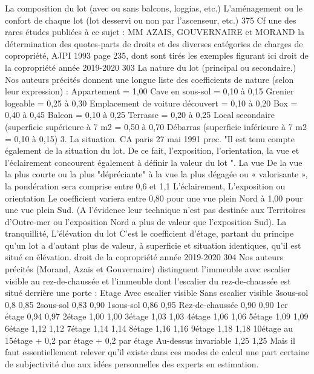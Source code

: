		La composition du lot (avec ou sans balcons, loggias, etc.)
		L'aménagement ou le confort de chaque lot (lot desservi ou non par l'ascenseur, etc.)
		375 Cf une des rares études publiées à ce sujet : MM AZAIS, GOUVERNAIRE et MORAND la détermination des quotes-parts de droits et des diverses catégories de charges de copropriété, AJPI 1993 page 235, dont sont tirés les exemples figurant ici
		droit de la copropriété année 2019-2020
		303
		La nature du lot (principal ou secondaire.)
		Nos auteurs précités donnent une longue liste des coefficients de nature (selon leur expression) :
		Appartement = 1,00
		Cave en sous-sol = 0,10 à 0,15
		Grenier logeable = 0,25 à 0,30
		Emplacement de voiture découvert = 0,10 à 0,20
		Box = 0,40 à 0,45
		Balcon = 0,10 à 0,25
		Terrasse = 0,20 à 0,25
		Local secondaire (superficie supérieure à 7 m2 = 0,50 à 0,70
		Débarras (superficie inférieure à 7 m2 = 0,10 à 0,15)
		3. La situation.
		CA paris 27 mai 1991 prec.
		"Il est tenu compte également de la situation du lot. De ce fait, l'exposition, l'orientation, la vue et l'éclairement concourent également à définir la valeur du lot ".
		La vue
		De la vue la plus courte ou la plus "dépréciante" à la vue la plus dégagée ou « valorisante », la pondération sera comprise entre 0,6 et 1,1
		L'éclairement,
		L'exposition ou orientation
		Le coefficient variera entre 0,80 pour une vue plein Nord à 1,00 pour une vue plein Sud. (A l'évidence leur technique n'est pas destinée aux Territoires d'Outre-mer ou l'exposition Nord a plus de valeur que l'exposition Sud).
		La tranquillité,
		L'élévation du lot
		C'est le coefficient d'étage, partant du principe qu'un lot a d'autant plus de valeur, à superficie et situation identiques, qu'il est situé en élévation.
		droit de la copropriété année 2019-2020
		304
		Nos auteurs précités (Morand, Azaïs et Gouvernaire) distinguent l'immeuble avec escalier visible au rez-de-chaussée et l'immeuble dont l’escalier du rez-de-chaussée est situé derrière une porte :
		Etage
		Avec escalier visible
		Sans escalier visible
		3\degres sous-sol
		0,8
		0,85
		2\degres sous-sol
		0,83
		0,90
		1\degres sous-sol
		0,86
		0,95
		Rez-de-chaussée
		0,90
		0,90
		1er étage
		0,94
		0,97
		2\degres étage
		1,00
		1,00
		3\degres étage
		1,03
		1,03
		4\degres étage
		1,06
		1,06
		5\degres étage
		1,09
		1,09
		6\degres étage
		1,12
		1,12
		7\degres étage
		1,14
		1,14
		8\degres étage
		1,16
		1,16
		9\degres étage
		1,18
		1,18
		10\degres étage au 15\degres étage
		+ 0,2 par étage
		+ 0,2 par étage
		Au-dessus invariable
		1,25
		1,25
		Mais il faut essentiellement relever qu'il existe dans ces modes de calcul une part certaine de subjectivité due aux idées personnelles des experts en estimation.
	
